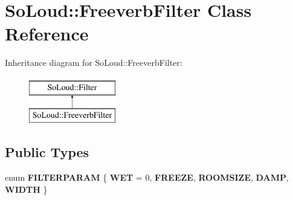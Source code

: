 \hypertarget{class_so_loud_1_1_freeverb_filter}{}\section{So\+Loud\+::Freeverb\+Filter Class Reference}
\label{class_so_loud_1_1_freeverb_filter}
Inheritance diagram for So\+Loud\+::Freeverb\+Filter\+:\begin{figure}[H]
\begin{center}
\leavevmode
\includegraphics[height=2.000000cm]{class_so_loud_1_1_freeverb_filter}
\end{center}
\end{figure}
\subsection*{Public Types}
\begin{DoxyCompactItemize}
\item 
\mbox{\label{class_so_loud_1_1_freeverb_filter_a06e58d6ab4f9fa2b902d8cbb6790291b}} 
enum {\bfseries F\+I\+L\+T\+E\+R\+P\+A\+R\+AM} \{ \newline
{\bfseries W\+ET} = 0, 
{\bfseries F\+R\+E\+E\+ZE}, 
{\bfseries R\+O\+O\+M\+S\+I\+ZE}, 
{\bfseries D\+A\+MP}, 
\newline
{\bfseries W\+I\+D\+TH}
 \}
\end{DoxyCompactItemize}
